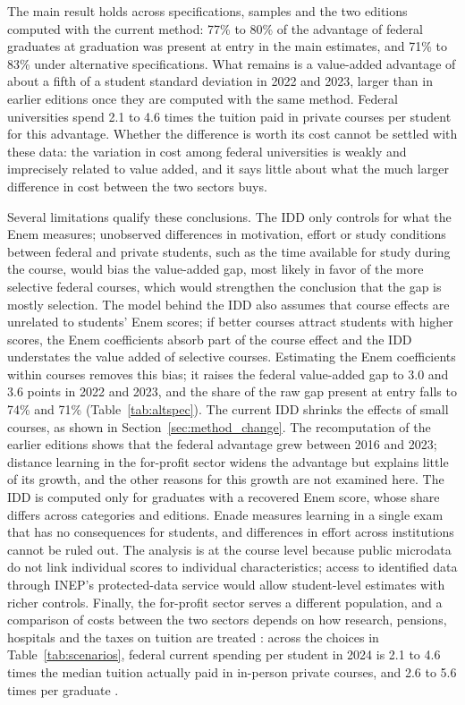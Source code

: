 \documentclass[12pt,letterpaper]{article}
\begin{document}
The main result holds across specifications, samples and the two editions computed with the current method: 77\% to 80\% of the advantage of federal graduates at graduation was present at entry in the main estimates, and 71\% to 83\% under alternative specifications. What remains is a value-added advantage of about a fifth of a student standard deviation in 2022 and 2023, larger than in earlier editions once they are computed with the same method. Federal universities spend 2.1 to 4.6 times the tuition paid in private courses per student for this advantage. Whether the difference is worth its cost cannot be settled with these data: the variation in cost among federal universities is weakly and imprecisely related to value added, and it says little about what the much larger difference in cost between the two sectors buys.

Several limitations qualify these conclusions. The IDD only controls for what the Enem measures; unobserved differences in motivation, effort or study conditions between federal and private students, such as the time available for study during the course, would bias the value-added gap, most likely in favor of the more selective federal courses, which would strengthen the conclusion that the gap is mostly selection. The model behind the IDD also assumes that course effects are unrelated to students' Enem scores; if better courses attract students with higher scores, the Enem coefficients absorb part of the course effect and the IDD understates the value added of selective courses. Estimating the Enem coefficients within courses removes this bias; it raises the federal value-added gap to 3.0 and 3.6 points in 2022 and 2023, and the share of the raw gap present at entry falls to 74\% and 71\% (Table~\ref{tab:altspec}). The current IDD shrinks the effects of small courses, as shown in Section~\ref{sec:method_change}. The recomputation of the earlier editions shows that the federal advantage grew between 2016 and 2023; distance learning in the for-profit sector widens the advantage but explains little of its growth, and the other reasons for this growth are not examined here. The IDD is computed only for graduates with a recovered Enem score, whose share differs across categories and editions. Enade measures learning in a single exam that has no consequences for students, and differences in effort across institutions cannot be ruled out. The analysis is at the course level because public microdata do not link individual scores to individual characteristics; access to identified data through INEP's protected-data service would allow student-level estimates with richer controls. Finally, the for-profit sector serves a different population, and a comparison of costs between the two sectors depends on how research, pensions, hospitals and the taxes on tuition are treated \citep{bielschowsky2022}: across the choices in Table~\ref{tab:scenarios}, federal current spending per student in 2024 is 2.1 to 4.6 times the median tuition actually paid in in-person private courses, and 2.6 to 5.6 times per graduate \citep{cgu2024,hoper2026}.
\end{document}
